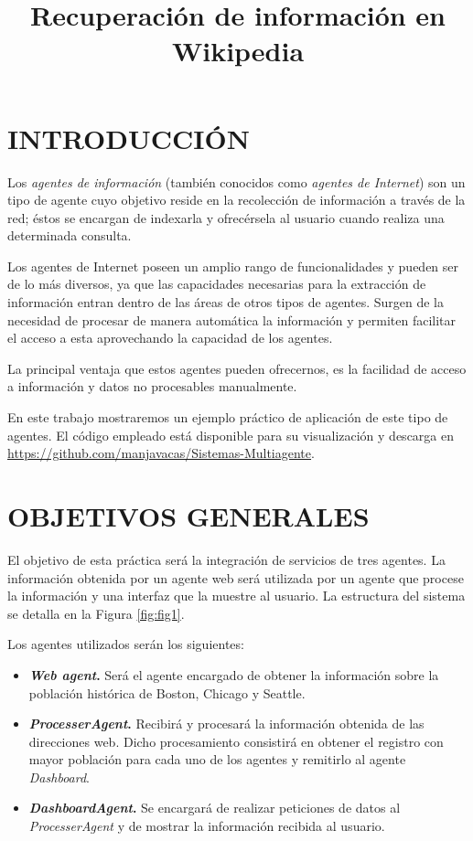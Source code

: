 \documentclass{estilo}
\title{Recuperación de información en Wikipedia}
\begin{document}
    \maketitle
    \tableofcontents

    \newpage
    
    \section{INTRODUCCIÓN}
    
    Los \textit{agentes de información} (también conocidos como \textit{agentes de Internet}) son un tipo de agente cuyo objetivo reside en la recolección de información a través de la red; éstos se encargan de indexarla y ofrecérsela al usuario cuando realiza una determinada consulta.
    
    Los agentes de Internet poseen un amplio rango de funcionalidades y pueden ser de lo más diversos, ya que las capacidades necesarias para la extracción de información entran dentro de las áreas de otros tipos de agentes. Surgen de la necesidad de procesar de manera automática la información y permiten facilitar el acceso a esta  aprovechando la capacidad de los agentes.

    La principal ventaja que estos agentes pueden ofrecernos, es la facilidad de acceso a información y datos no procesables manualmente.
    
    En este trabajo mostraremos un ejemplo práctico de aplicación de este tipo de agentes. El código empleado está disponible para su visualización y descarga en \url{https://github.com/manjavacas/Sistemas-Multiagente}. 
    
    \bigskip
    \section{OBJETIVOS GENERALES}
    
    El objetivo de esta práctica será la integración de servicios de tres agentes. La información obtenida por un agente web será utilizada por un agente que procese la información y una interfaz que la muestre al usuario. La estructura del sistema se detalla en la Figura \ref{fig:fig1}.

    Los agentes utilizados serán los siguientes:
    \begin{itemize}
        \item \textbf{\textit{Web agent}.} Será el agente encargado de obtener la información sobre la población histórica de Boston, Chicago y Seattle.
        \item \textbf{\textit{ProcesserAgent}.} Recibirá y procesará la información obtenida de las direcciones web. Dicho procesamiento consistirá en obtener el registro con mayor población para cada uno de los agentes y remitirlo al agente \textit{Dashboard}.
        \item \textbf{\textit{DashboardAgent}.} Se encargará de realizar peticiones de datos al \textit{ProcesserAgent} y de mostrar la información recibida al usuario.
    \end{itemize}
\end{document}
